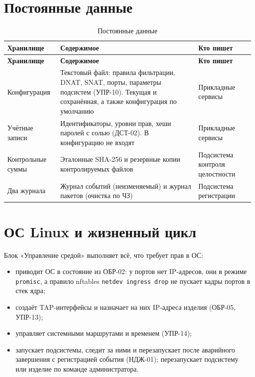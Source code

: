\documentclass[12pt,a4paper,final]{article}
\begin{document}
\section{Постоянные данные}\label{sec:data}

{\small
\begin{longtable}{|L{3.2cm}|L{6.4cm}|L{5.0cm}|}
\caption{Постоянные данные}\label{tab:data}\\
\hline
\textbf{Хранилище} & \textbf{Содержимое} & \textbf{Кто пишет}\\
\hline\endfirsthead
\hline
\textbf{Хранилище} & \textbf{Содержимое} & \textbf{Кто пишет}\\
\hline\endhead
Конфигурация & Текстовый файл: правила фильтрации, DNAT, SNAT, порты,
  параметры подсистем (УПР-10). Текущая и сохранённая, а также конфигурация
  по умолчанию & Прикладные сервисы\\ \hline
Учётные записи & Идентификаторы, уровни прав, хеши паролей с солью (ДСТ-02).
  В конфигурацию не входят & Прикладные сервисы\\ \hline
Контрольные суммы & Эталонные SHA-256 и резервные копии контролируемых файлов &
  Подсистема контроля целостности\\ \hline
Два журнала & Журнал событий (неизменяемый) и журнал пакетов (очистка по ЧЗ) &
  Подсистема регистрации\\ \hline
\end{longtable}
}

\section{ОС Linux и жизненный цикл}\label{sec:os}

Блок «Управление средой» выполняет всё, что требует прав в ОС:
\begin{itemize}
\item приводит ОС в состояние из ОБР-02: у портов нет IP-адресов, они
  в режиме \texttt{promisc}, а правило nftables \texttt{netdev ingress drop}
  не пускает кадры портов в стек ядра;
\item создаёт TAP-интерфейсы и назначает на них IP-адреса изделия (ОБР-05,
  УПР-13);
\item управляет системными маршрутами и временем (УПР-14);
\item запускает подсистемы, следит за ними и перезапускает после аварийного
  завершения с регистрацией события (НДЖ-01); перезапускает подсистему или
  изделие по команде администратора.
\end{itemize}
\end{document}
